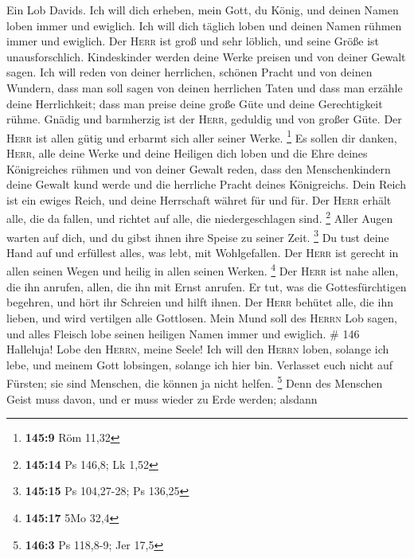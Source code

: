  Ein Lob Davids. Ich will dich erheben, mein Gott, du
König, und deinen Namen loben immer und ewiglich.  Ich
will dich täglich loben und deinen Namen rühmen immer und ewiglich.
 Der \textsc{Herr} ist groß und sehr löblich, und seine
Größe ist unausforschlich.  Kindeskinder werden deine
Werke preisen und von deiner Gewalt sagen.  Ich will reden
von deiner herrlichen, schönen Pracht und von deinen Wundern,
 dass man soll sagen von deinen herrlichen Taten und dass
man erzähle deine Herrlichkeit;  dass man preise deine
große Güte und deine Gerechtigkeit rühme.  Gnädig und
barmherzig ist der \textsc{Herr}, geduldig und von großer Güte.
 Der \textsc{Herr} ist allen gütig und erbarmt sich aller
seiner Werke. \footnote{\textbf{145:9} Röm 11,32}  Es
sollen dir danken, \textsc{Herr}, alle deine Werke und deine Heiligen
dich loben  und die Ehre deines Königreiches rühmen und
von deiner Gewalt reden,  dass den Menschenkindern deine
Gewalt kund werde und die herrliche Pracht deines Königreichs.
 Dein Reich ist ein ewiges Reich, und deine Herrschaft
währet für und für.  Der \textsc{Herr} erhält alle, die
da fallen, und richtet auf alle, die niedergeschlagen sind. \footnote{\textbf{145:14}
  Ps 146,8; Lk 1,52}  Aller Augen warten auf dich, und du
gibst ihnen ihre Speise zu seiner Zeit. \footnote{\textbf{145:15} Ps
  104,27-28; Ps 136,25}  Du tust deine Hand auf und
erfüllest alles, was lebt, mit Wohlgefallen.  Der
\textsc{Herr} ist gerecht in allen seinen Wegen und heilig in allen
seinen Werken. \footnote{\textbf{145:17} 5Mo 32,4}  Der
\textsc{Herr} ist nahe allen, die ihn anrufen, allen, die ihn mit Ernst
anrufen.  Er tut, was die Gottesfürchtigen begehren, und
hört ihr Schreien und hilft ihnen.  Der \textsc{Herr}
behütet alle, die ihn lieben, und wird vertilgen alle Gottlosen.
 Mein Mund soll des \textsc{Herrn} Lob sagen, und alles
Fleisch lobe seinen heiligen Namen immer und ewiglich. \# 146
 Halleluja! Lobe den \textsc{Herrn}, meine Seele!
 Ich will den \textsc{Herrn} loben, solange ich lebe, und
meinem Gott lobsingen, solange ich hier bin.  Verlasset
euch nicht auf Fürsten; sie sind Menschen, die können ja nicht helfen.
\footnote{\textbf{146:3} Ps 118,8-9; Jer 17,5}  Denn des
Menschen Geist muss davon, und er muss wieder zu Erde werden; alsdann
